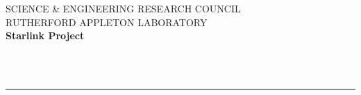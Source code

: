 \newcommand {\manparameterentry}[3]{\manparameterzss\gdef\manparameterzss{\\}%
\gdef\manparameterzhl{\hline}\manparameterorder{#1}{#2}{#3}}



\newenvironment {manenumerate}{\begin{enumerate}}{\end{enumerate}}

\newcommand {\manenumerateitem}[1]{\item [#1]}

\newenvironment {manitemize}{\begin{itemize}}{\end{itemize}}

\newcommand {\manitemizeitem}{\item}

\newenvironment {mandescription}{\begin{description}\begin{description}}%
{\end{description}\end{description}}

\newcommand {\mandescriptionitem}[1]{\item [#1]}

\newcommand {\mantt}{\tt}

\newcommand {\manheadstyle}{}



\newcommand{\undersc}{{\_}\hspace{0.2ex}}
\newcommand{\ajhsect}[2]{ \markboth
      { $ \:\:\:\:\:\: \bullet \:\: $ #1 $ \:\: \cdot \:\: $ #2 \hfill SUN/\stardocnumber}
      { SUN/\stardocnumber \hfill #2 $ \:\: \cdot \:\: $ #1 $ \:\: \bullet \:\:\:\:\:\: $ } 
                          }




\thispagestyle{empty}




SCIENCE \& ENGINEERING RESEARCH COUNCIL \hfill \stardocname\\
RUTHERFORD APPLETON LABORATORY\\
{\large\bf Starlink Project\\}
{\large\bf \stardoccategory\ \stardocnumber}
\begin{flushright}
\stardocauthors\\
\stardocdate
\end{flushright}
\vspace{-4mm}
\rule{\textwidth}{0.5mm}



